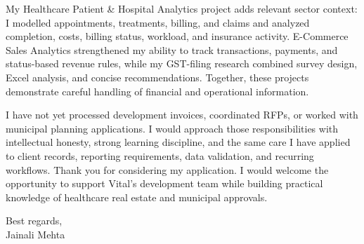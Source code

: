 \documentclass[letterpaper,11pt]{article}
\begin{document}
\bigbreak
My Healthcare Patient \& Hospital Analytics project adds relevant sector context: I modelled appointments, treatments, billing, and claims and analyzed completion, costs, billing status, workload, and insurance activity. E-Commerce Sales Analytics strengthened my ability to track transactions, payments, and status-based revenue rules, while my GST-filing research combined survey design, Excel analysis, and concise recommendations. Together, these projects demonstrate careful handling of financial and operational information.

\bigbreak
I have not yet processed development invoices, coordinated RFPs, or worked with municipal planning applications. I would approach those responsibilities with intellectual honesty, strong learning discipline, and the same care I have applied to client records, reporting requirements, data validation, and recurring workflows. Thank you for considering my application. I would welcome the opportunity to support Vital's development team while building practical knowledge of healthcare real estate and municipal approvals.

\bigbreak
Best regards,\\
Jainali Mehta
\end{document}
